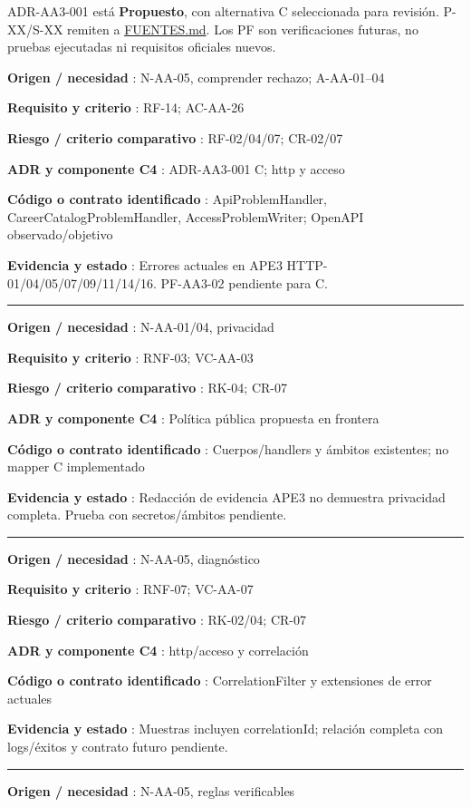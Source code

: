 \documentclass[12pt,a4paper]{report}
\begin{document}
ADR-AA3-001 está \textbf{Propuesto}, con alternativa C seleccionada para
revisión. P-XX/S-XX remiten a \url{FUENTES.md}. Los PF son
verificaciones futuras, no pruebas ejecutadas ni requisitos oficiales
nuevos.

\textbf{Origen / necesidad }: N-AA-05, comprender rechazo; A-AA-01--04

\textbf{Requisito y criterio }: RF-14; AC-AA-26

\textbf{Riesgo / criterio comparativo }: RF-02/04/07; CR-02/07

\textbf{ADR y componente C4 }: ADR-AA3-001 C; http y acceso

\textbf{Código o contrato identificado }: ApiProblemHandler,
CareerCatalogProblemHandler, AccessProblemWriter; OpenAPI
observado/objetivo

\textbf{Evidencia y estado }: Errores actuales en APE3
HTTP-01/04/05/07/09/11/14/16. PF-AA3-02 pendiente para C.

\medskip\hrule\medskip

\textbf{Origen / necesidad }: N-AA-01/04, privacidad

\textbf{Requisito y criterio }: RNF-03; VC-AA-03

\textbf{Riesgo / criterio comparativo }: RK-04; CR-07

\textbf{ADR y componente C4 }: Política pública propuesta en frontera

\textbf{Código o contrato identificado }: Cuerpos/handlers y ámbitos
existentes; no mapper C implementado

\textbf{Evidencia y estado }: Redacción de evidencia APE3 no demuestra
privacidad completa. Prueba con secretos/ámbitos pendiente.

\medskip\hrule\medskip

\textbf{Origen / necesidad }: N-AA-05, diagnóstico

\textbf{Requisito y criterio }: RNF-07; VC-AA-07

\textbf{Riesgo / criterio comparativo }: RK-02/04; CR-07

\textbf{ADR y componente C4 }: http/acceso y correlación

\textbf{Código o contrato identificado }: CorrelationFilter y
extensiones de error actuales

\textbf{Evidencia y estado }: Muestras incluyen correlationId; relación
completa con logs/éxitos y contrato futuro pendiente.

\medskip\hrule\medskip

\textbf{Origen / necesidad }: N-AA-05, reglas verificables
\end{document}
